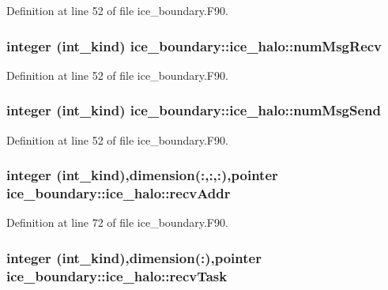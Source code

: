 Definition at line 52 of file ice\_\-boundary.F90.\hypertarget{typeice__boundary_1_1ice__halo_aba8e9b8f14be29157688614ca6fd5fe4}{
\subsubsection[{numMsgRecv}]{\setlength{\rightskip}{0pt plus 5cm}integer (int\_\-kind) {\bf ice\_\-boundary::ice\_\-halo::numMsgRecv}}}
\label{typeice__boundary_1_1ice__halo_aba8e9b8f14be29157688614ca6fd5fe4}


Definition at line 52 of file ice\_\-boundary.F90.\hypertarget{typeice__boundary_1_1ice__halo_a361ae70131f21b9bf2a73846897687c7}{
\subsubsection[{numMsgSend}]{\setlength{\rightskip}{0pt plus 5cm}integer (int\_\-kind) {\bf ice\_\-boundary::ice\_\-halo::numMsgSend}}}
\label{typeice__boundary_1_1ice__halo_a361ae70131f21b9bf2a73846897687c7}


Definition at line 52 of file ice\_\-boundary.F90.\hypertarget{typeice__boundary_1_1ice__halo_a68312a01cf31b733be7e0fb3ef9ab42c}{
\subsubsection[{recvAddr}]{\setlength{\rightskip}{0pt plus 5cm}integer (int\_\-kind),dimension(:,:,:),pointer {\bf ice\_\-boundary::ice\_\-halo::recvAddr}}}
\label{typeice__boundary_1_1ice__halo_a68312a01cf31b733be7e0fb3ef9ab42c}


Definition at line 72 of file ice\_\-boundary.F90.\hypertarget{typeice__boundary_1_1ice__halo_aaad7d6023e014b677e11253c0ee55f77}{
\subsubsection[{recvTask}]{\setlength{\rightskip}{0pt plus 5cm}integer (int\_\-kind),dimension(:),pointer {\bf ice\_\-boundary::ice\_\-halo::recvTask}}}
\label{typeice__boundary_1_1ice__halo_aaad7d6023e014b677e11253c0ee55f77}


